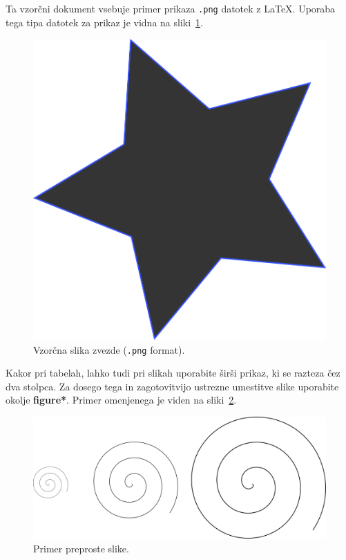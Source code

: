 \documentclass[article,slovene]{stucosrec}
\newcommand{\latex}{\LaTeX\xspace}
\begin{document}
	Ta vzorčni dokument vsebuje primer prikaza \texttt{.png} datotek z \latex.
	Uporaba tega tipa datotek za prikaz je vidna na sliki~\ref{fig:star}.
	
	\begin{figure}
		\centering
		\includegraphics[scale=0.5]{star.png}
		\caption{Vzorčna slika zvezde (\texttt{.png} format).}
		\label{fig:star}
	\end{figure}

	Kakor pri tabelah, lahko tudi pri slikah uporabite širši prikaz, ki se razteza čez dva stolpca.
	Za dosego tega in zagotovitvijo ustrezne umestitve slike uporabite okolje \textbf{figure*}.
	Primer omenjenega je viden na sliki~\ref{fig:spin}.
	
	\begin{figure}
		\centering
		\includegraphics[scale=0.8]{spin.png}
		\caption{Primer preproste slike.}
		\label{fig:spin}
	\end{figure}
\end{document}
